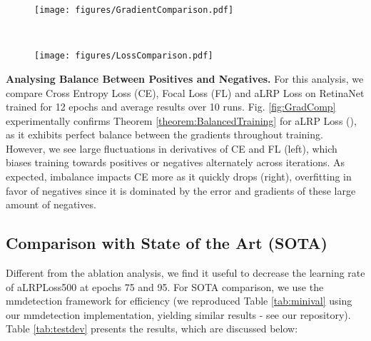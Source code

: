 \documentclass{article}
\newcommand{\comment}[1]{}
\begin{document}
\begin{figure*}[t!]
    \begin{subfigure}[t]{0.45\textwidth}
        \centering
        \texttt{[image: figures/GradientComparison.pdf]}
    \end{subfigure}
    ~
    \begin{subfigure}[t]{0.42\textwidth}
        \centering
        \texttt{[image: figures/LossComparison.pdf]}
    \end{subfigure}    
    \caption{\textbf{(left)} The rate of the total gradient magnitudes of negatives to positives. \textbf{(right)} Loss values. \label{fig:GradComp}}
\end{figure*}
\textbf{Analysing Balance Between Positives and Negatives.}
For this analysis, we compare Cross Entropy Loss (CE), Focal Loss (FL) and aLRP Loss on RetinaNet trained for 12 epochs and average results over 10 runs. Fig. \ref{fig:GradComp} experimentally confirms Theorem \ref{theorem:BalancedTraining} for aLRP Loss (), as it exhibits perfect balance between the gradients throughout training. However, we see large fluctuations in derivatives of CE and FL (left), which biases training towards positives or negatives alternately across iterations. As expected, imbalance impacts CE more as it quickly drops (right), overfitting in favor of negatives since it is dominated by the error and gradients of these large amount of negatives.

\comment{
\textbf{It is crucial to set  as the target error when an example is ranked properly.} Fig. \ref{fig:GradComp} presents a case where  is set to 0 (i.e. minimum value of aLRP). For this case, the training continues properly similar to aLRP Loss up to a point and then diverges. Note that this occurs when the positives start to be ranked properly but are still assigned gradients since  due to the nonzero localization error. This causes , violating Theorem \ref{theorem:BalancedTraining} (compare min-rate and max-rate in Fig. \ref{fig:GradComp}). Therefore, assigning proper targets as indicated in Section \ref{sec:generalization} is crucial for balanced training.
}





\subsection{Comparison with State of the Art (SOTA)}
\label{sect:comparison}
Different from the ablation analysis, we find it useful to decrease the learning rate of aLRPLoss500 at epochs 75 and 95. For SOTA comparison, we use the mmdetection framework \cite{mmdetection} for efficiency (we reproduced Table \ref{tab:minival} using our mmdetection implementation, yielding similar results - see our repository). Table \ref{tab:testdev} presents the results, which are discussed below: 
\end{document}
